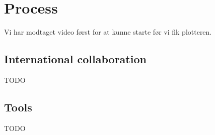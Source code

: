
\section{Process}

Vi har modtaget video først for at kunne starte før vi fik plotteren.

\subsection{International collaboration}

TODO

\subsection{Tools}

TODO